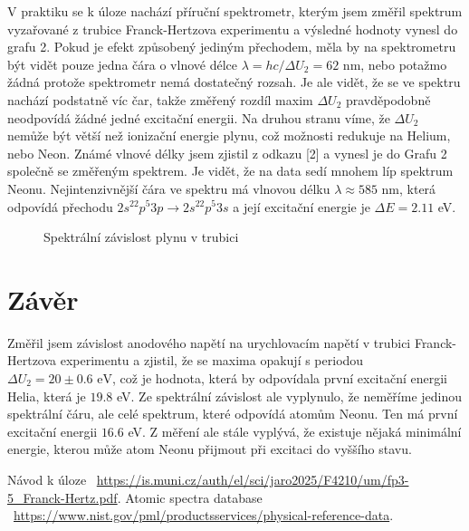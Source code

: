 \documentclass[a4paper,11pt]{article}
\begin{document}
V praktiku se k úloze nachází příruční spektrometr, kterým jsem změřil spektrum vyzařované z trubice Franck-Hertzova experimentu a výsledné hodnoty vynesl do grafu 2. Pokud je efekt způsobený jediným přechodem, měla by na spektrometru být vidět pouze jedna čára o vlnové délce $ \lambda = hc / \Delta U_2 = 62 $ nm, nebo potažmo žádná protože spektrometr nemá dostatečný rozsah. Je ale vidět, že se ve spektru nachází podstatně víc čar, takže změřený rozdíl maxim $ \Delta U_2 $ pravděpodobně neodpovídá žádné jedné excitační energii. Na druhou stranu víme, že $ \Delta U_2 $ nemůže být větší než ionizační energie plynu, což možnosti redukuje na Helium, nebo Neon. Známé vlnové délky jsem zjistil z odkazu [2] a vynesl je do Grafu 2 společně se změřeným spektrem. Je vidět, že na data sedí mnohem líp spektrum Neonu. Nejintenzivnější čára ve spektru má vlnovou délku $ \lambda \approx 585 $ nm, která odpovídá přechodu $ 2s^22p^{5}3p \to  2s^22p^{5}3s $ a její excitační energie je $ \Delta E = 2.11 $ eV. 

\begin{figure}[htpb]
    \centering
    
    \captionsetup{type=graph}
    \caption{Spektrální závislost plynu v trubici}
\end{figure}

\section{Závěr}

Změřil jsem závislost anodového napětí na urychlovacím napětí v trubici Franck-Hertzova experimentu a zjistil, že se maxima opakují s periodou $ \Delta U_2 = 20 \pm 0.6 \text{ eV} $, což je hodnota, která by odpovídala první excitační energii Helia, která je $ 19.8 $ eV. Ze spektrální závislost ale vyplynulo, že neměříme jedinou spektrální čáru, ale celé spektrum, které odpovídá atomům Neonu. Ten má první excitační energii $ 16.6 $ eV. Z měření ale stále vyplývá, že existuje nějaká minimální energie, kterou může atom Neonu přijmout při excitaci do vyššího stavu.  

\begin{thebibliography}{0}
 Návod k úloze ~\url{https://is.muni.cz/auth/el/sci/jaro2025/F4210/um/fp3-5_Franck-Hertz.pdf}.   
 Atomic spectra database  \\ ~\url{https://www.nist.gov/pml/productsservices/physical-reference-data}.   
\end{thebibliography}
\end{document}
